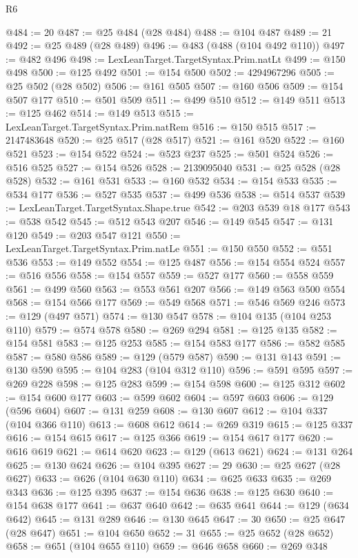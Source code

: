 \begin{lexlean}{R6}
\begin{coremodule}
@484 := 20
@487 := @25 @484 (@28 @484)
@488 := @104 @487
@489 := 21
@492 := @25 @489 (@28 @489)
@496 := @483 (@488 (@104 @492 @110))
@497 := @482 @496
@498 := LexLeanTarget.TargetSyntax.Prim.natLt
@499 := @150 @498
@500 := @125 @492
@501 := @154 @500
@502 := 4294967296
@505 := @25 @502 (@28 @502)
@506 := @161 @505
@507 := @160 @506
@509 := @154 @507 @177
@510 := @501 @509
@511 := @499 @510
@512 := @149 @511
@513 := @125 @462
@514 := @149 @513
@515 := LexLeanTarget.TargetSyntax.Prim.natRem
@516 := @150 @515
@517 := 2147483648
@520 := @25 @517 (@28 @517)
@521 := @161 @520
@522 := @160 @521
@523 := @154 @522
@524 := @523 @237
@525 := @501 @524
@526 := @516 @525
@527 := @154 @526
@528 := 2139095040
@531 := @25 @528 (@28 @528)
@532 := @161 @531
@533 := @160 @532
@534 := @154 @533
@535 := @534 @177
@536 := @527 @535
@537 := @499 @536
@538 := @514 @537
@539 := LexLeanTarget.TargetSyntax.Shape.true
@542 := @203 @539 @18 @177
@543 := @538 @542
@545 := @512 @543 @207
@546 := @149 @545
@547 := @131 @120
@549 := @203 @547 @121
@550 := LexLeanTarget.TargetSyntax.Prim.natLe
@551 := @150 @550
@552 := @551 @536
@553 := @149 @552
@554 := @125 @487
@556 := @154 @554 @524
@557 := @516 @556
@558 := @154 @557
@559 := @527 @177
@560 := @558 @559
@561 := @499 @560
@563 := @553 @561 @207
@566 := @149 @563 @500 @554
@568 := @154 @566 @177
@569 := @549 @568
@571 := @546 @569 @246
@573 := @129 (@497 @571)
@574 := @130 @547
@578 := @104 @135 (@104 @253 @110)
@579 := @574 @578
@580 := @269 @294
@581 := @125 @135
@582 := @154 @581
@583 := @125 @253
@585 := @154 @583 @177
@586 := @582 @585
@587 := @580 @586
@589 := @129 (@579 @587)
@590 := @131 @143
@591 := @130 @590
@595 := @104 @283 (@104 @312 @110)
@596 := @591 @595
@597 := @269 @228
@598 := @125 @283
@599 := @154 @598
@600 := @125 @312
@602 := @154 @600 @177
@603 := @599 @602
@604 := @597 @603
@606 := @129 (@596 @604)
@607 := @131 @259
@608 := @130 @607
@612 := @104 @337 (@104 @366 @110)
@613 := @608 @612
@614 := @269 @319
@615 := @125 @337
@616 := @154 @615
@617 := @125 @366
@619 := @154 @617 @177
@620 := @616 @619
@621 := @614 @620
@623 := @129 (@613 @621)
@624 := @131 @264
@625 := @130 @624
@626 := @104 @395
@627 := 29
@630 := @25 @627 (@28 @627)
@633 := @626 (@104 @630 @110)
@634 := @625 @633
@635 := @269 @343
@636 := @125 @395
@637 := @154 @636
@638 := @125 @630
@640 := @154 @638 @177
@641 := @637 @640
@642 := @635 @641
@644 := @129 (@634 @642)
@645 := @131 @289
@646 := @130 @645
@647 := 30
@650 := @25 @647 (@28 @647)
@651 := @104 @650
@652 := 31
@655 := @25 @652 (@28 @652)
@658 := @651 (@104 @655 @110)
@659 := @646 @658
@660 := @269 @348

\end{coremodule}
\end{lexlean}
